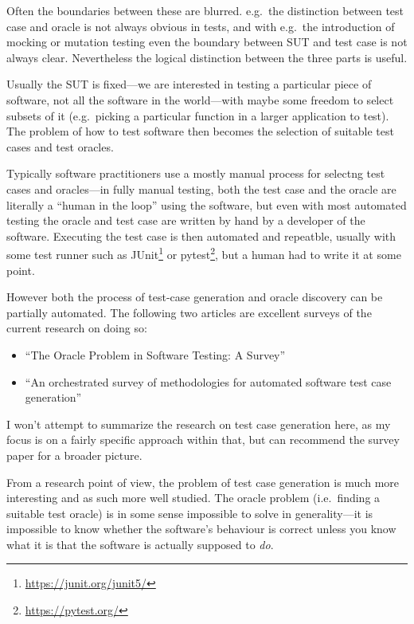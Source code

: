 Often the boundaries between these are blurred.
e.g.\ the distinction between test case and oracle is not always obvious in tests,
and with e.g.\ the introduction of mocking or mutation testing even the boundary between SUT and test case is not always clear.
Nevertheless the logical distinction between the three parts is useful.

Usually the SUT is fixed---we are interested in testing a particular piece of software,
not all the software in the world---with
maybe some freedom to select subsets of it (e.g.\ picking a particular function in a larger application to test).
The problem of how to test software then becomes the selection of suitable test cases and test oracles.

Typically software practitioners use a mostly manual process for selectng test cases and oracles---in
fully manual testing,
both the test case and the oracle are literally a ``human in the loop'' using the software,
but even with most automated testing the oracle and test case are written by hand by a developer of the software.
Executing the test case is then automated and repeatble, usually with some test runner such as JUnit\footnote{\url{https://junit.org/junit5/}} or pytest\footnote{\url{https://pytest.org/}},
but a human had to write it at some point.

However both the process of test-case generation and oracle discovery can be partially automated.
The following two articles are excellent surveys of the current research on doing so:

\begin{itemize}
\item ``The Oracle Problem in Software Testing: {A} Survey''\cite{DBLP:journals/tse/BarrHMSY15}
\item ``An orchestrated survey of methodologies for automated software test case generation''\cite{DBLP:journals/jss/AnandBCCCGHHMOE13}
\end{itemize}

I won't attempt to summarize the research on test case generation here,
as my focus is on a fairly specific approach within that,
but can recommend the survey paper for a broader picture.

From a research point of view,
the problem of test case generation is much more interesting and as such more well studied.
The oracle problem (i.e.\ finding a suitable test oracle) is in some sense impossible to solve in generality---it
is impossible to know whether the software's behaviour is correct unless you know what it is that the software is actually supposed to \emph{do}.

